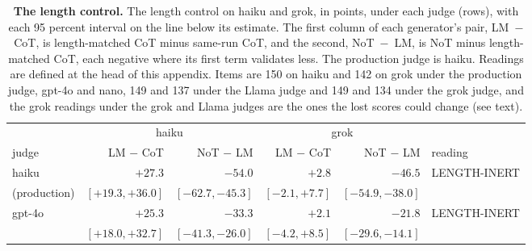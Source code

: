 \begin{table}[tp]
\centering
\small
\caption{\textbf{The length control.} The length control on haiku and grok, in points, under each judge
(rows), with each 95 percent interval on the line below its estimate. The
first column of each generator's pair, LM~$-$~CoT, is length-matched CoT minus
same-run CoT, and the second, NoT~$-$~LM, is NoT minus length-matched CoT,
each negative where its first term validates less. The production judge is
haiku. Readings are defined at the head of this appendix. Items are 150 on haiku and 142 on grok
under the production judge, gpt-4o and nano, 149 and 137 under the Llama
judge and 149 and 134 under the grok judge, and the grok readings under the
grok and Llama judges are the ones the lost scores could change (see text).}
\label{tab-app-length}
{\footnotesize
\setlength{\tabcolsep}{4pt}%
\begin{tabular}{@{}lrrrrl@{}}
\toprule
 & \multicolumn{2}{c}{haiku} & \multicolumn{2}{c}{grok} & \\
\cmidrule(lr){2-3}\cmidrule(lr){4-5}
judge & LM $-$ CoT & NoT $-$ LM & LM $-$ CoT & NoT $-$ LM & reading \\
\midrule
haiku & $+27.3$ & $-54.0$ & $+2.8$ & $-46.5$ & LENGTH-INERT \\
(production) & $[+19.3, +36.0]$ & $[-62.7, -45.3]$ & $[-2.1, +7.7]$ & $[-54.9, -38.0]$ & \\[1pt]
gpt-4o & $+25.3$ & $-33.3$ & $+2.1$ & $-21.8$ & LENGTH-INERT \\
 & $[+18.0, +32.7]$ & $[-41.3, -26.0]$ & $[-4.2, +8.5]$ & $[-29.6, -14.1]$ & \\[1pt]

\end{tabular}}
\end{table}
